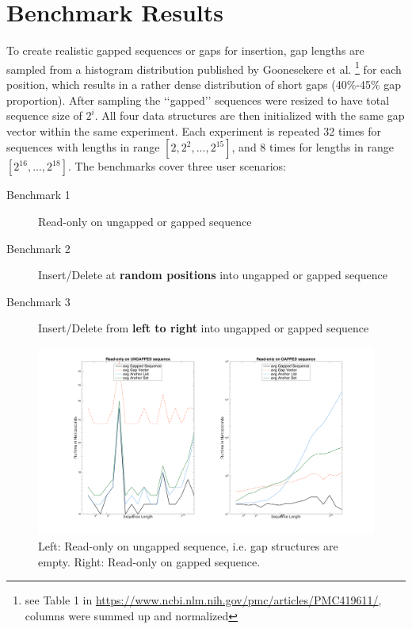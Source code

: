 \documentclass[11pt, letterpaper, twoside]{article}
\begin{document}
\section{Benchmark Results}
To create realistic gapped sequences or gaps for insertion, gap lengths are sampled from a histogram distribution published by Goonesekere et al. \footnote{see Table 1 in \url{https://www.ncbi.nlm.nih.gov/pmc/articles/PMC419611/}, columns were summed up and normalized} for each position, which results in a rather dense distribution of short gaps (40\%-45\% gap proportion). After sampling the \lq\lq gapped\rq\rq{} sequences were resized to have total sequence size of $2^i$. All four data structures are then initialized with the same gap vector within the same experiment. Each experiment is repeated 32 times for sequences with lengths in range $[2, 2^2, ..., 2^{15}]$, and 8 times for lengths in range $[2^{16}, ...,2^{18}]$. The benchmarks cover three user scenarios:
\begin{description}
    \item[Benchmark 1] Read-only on ungapped or gapped sequence
    \item[Benchmark 2] Insert/Delete at {\bf random positions} into ungapped or gapped sequence
    \item[Benchmark 3] Insert/Delete from {\bf left to right} into ungapped or gapped sequence
\end{description}

\begin{figure}[htpb]\centering
\includegraphics[scale=.4,trim={5cm 2cm 4.5cm 1.5cm},clip]{benchmark1_plot.png}
\caption{Left: Read-only on ungapped sequence, i.e. gap structures are empty. Right: 
Read-only on gapped sequence.}
\end{figure}
\end{document}
